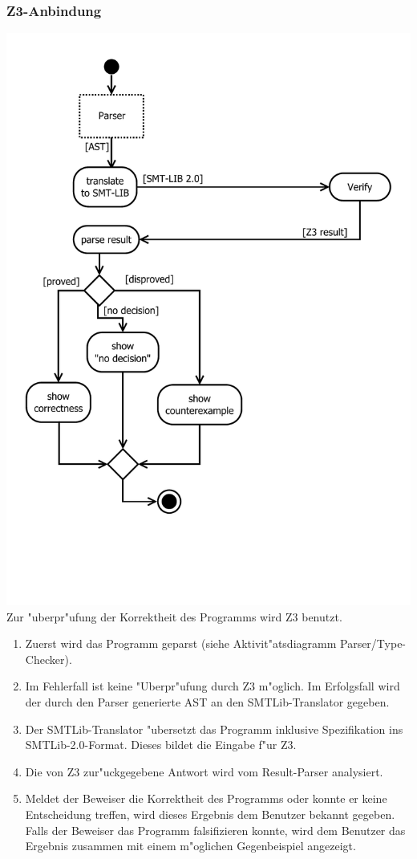 \documentclass[10pt,a4paper,titlepage]{article}
\begin{document}
\subsubsection{Z3-Anbindung}
\includegraphics[scale=0.6]{images/AktivitaetSMTTranslator.pdf}\\
Zur "uberpr"ufung der Korrektheit des Programms wird Z3 benutzt. \\
\begin{enumerate}
\item Zuerst wird das Programm geparst (siehe Aktivit"atsdiagramm Parser/Type-Checker).
\item Im Fehlerfall ist keine "Uberpr"ufung durch Z3 m"oglich. Im Erfolgsfall wird der durch den Parser generierte AST an den SMTLib-Translator gegeben.
\item Der SMTLib-Translator "ubersetzt das Programm inklusive Spezifikation ins SMTLib-2.0-Format. Dieses bildet die Eingabe f"ur Z3.
\item Die von Z3 zur"uckgegebene Antwort wird vom Result-Parser analysiert.
\item Meldet der Beweiser die Korrektheit des Programms oder konnte er keine Entscheidung treffen, wird dieses Ergebnis dem Benutzer bekannt gegeben. Falls der Beweiser das Programm falsifizieren konnte, wird dem Benutzer das Ergebnis zusammen mit einem m"oglichen Gegenbeispiel angezeigt.
\end{enumerate}
\end{document}
